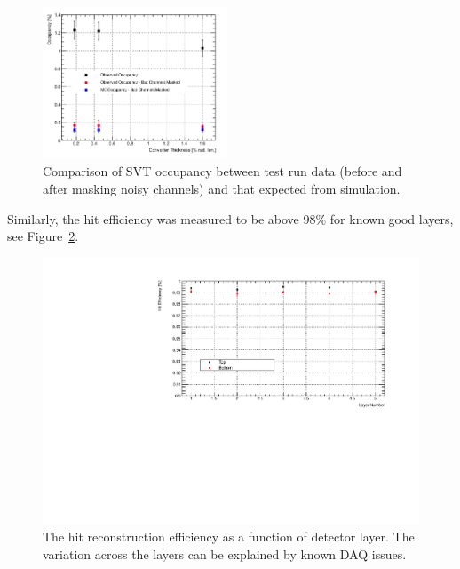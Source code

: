 \begin{figure}[ht]
    \includegraphics[width=0.49\textwidth]{test2012/svtperformance/daq/occupancy_vs_target_thick.pdf}
        \caption{ { \small
                    Comparison of SVT occupancy between test run data (before and after masking noisy channels) and that expected from simulation.
                } }
	\label{fig:data_rates_data_mc_cmp}
\end{figure}
Similarly, the hit efficiency was measured to be above 98\% for known good layers, see Figure~\ref{fig:hit_efficiency}.
\begin{figure}[ht]
    	\includegraphics[width=.95\textwidth]{test2012/svtperformance/trk_performance/hit_efficiency_vs_layer.pdf}
        \caption{{\small The hit reconstruction efficiency as a function of detector layer. The variation across the layers can be explained by known DAQ issues.}} 
	\label{fig:hit_efficiency}
\end{figure}

